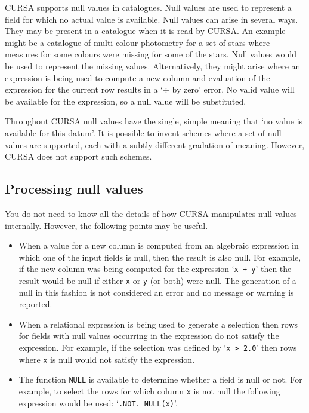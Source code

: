 \documentclass[twoside,11pt]{article}
\renewcommand{\_}{\texttt{\symbol{95}}}
\begin{document}
CURSA supports null values in catalogues. Null values are used to represent 
a field for which no actual value is available. Null values can arise in
several ways. They may be present in a catalogue when it is read by
CURSA. An example might be a catalogue of multi-colour photometry for a 
set of stars where measures for some colours were missing for some of the 
stars. Null values would be used to represent the missing values.
Alternatively, they might arise where an expression is being used to
compute a new column and evaluation of the expression for the current
row results in a `$\div$ by zero' error. No valid value will be
available for the expression, so a null value will be substituted.

Throughout CURSA null values have the single, simple meaning that `no value 
is available for this datum'. It is possible to invent schemes where a set 
of null values are supported, each with a subtly different gradation of 
meaning. However, CURSA does not support such schemes.

\subsection{Processing null values}

You do not need to know all the details of how CURSA manipulates null 
values internally. However, the following points may be useful.

\begin{itemize}

  \item When a value for a new column is computed from an algebraic
   expression in which one of the input fields is null, then the
   result is also null. For example, if the new column was being
   computed for the expression `{\tt x + y}' then the result would be
   null if either {\tt x} or {\tt y} (or both) were null. The generation
   of a null in this fashion is not considered an error and no message
   or warning is reported.

  \item When a relational expression is being used to generate a selection
   then rows for fields with null values occurring in the expression do not
   satisfy the expression. For example, if the selection was defined by
   `{\tt x > 2.0}' then rows where {\tt x} is null would not satisfy
   the expression.

  \item The function {\tt NULL} is available to determine whether a
   field is null or not. For example, to select the rows for which
   column {\tt x} is not null the following expression would be used:
   `{\tt .NOT. NULL(x)}'.

\end{itemize}
\end{document}
